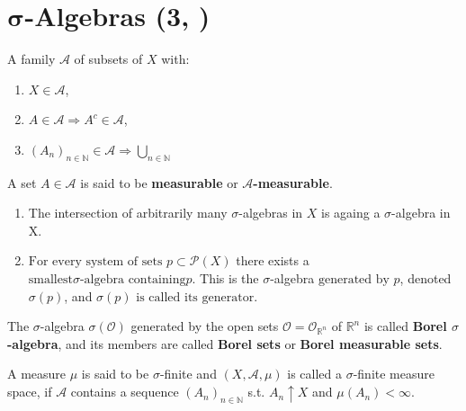 \section{\underline{}\(\boldsymbol{\sigma}\)-Algebras \tiny{(3, \cite{schilling2017measures})}}
\begin{definition}
    A family \(\mathscr{A}\) of subsets of \(X\) with:
    \begin{enumerate}[label=(\roman*)]
        \item \(X\in\mathscr{A}\), \label{ax:sigma1}
        \item \(A\in\mathscr{A} \Rightarrow A^c \in\mathscr{A}\), \label{ax:sigma2}
        \item \(\left( A_n \right)_{n\in\mathbb{N}} \in\mathscr{A} \Rightarrow \bigcup\limits_{n\in\mathbb{N}} \)
    \end{enumerate}
    A set \(A\in\mathscr{A}\) is said to be \textbf{measurable} or \(\boldsymbol{\mathscr{A}}\)\textbf{-measurable}.
\end{definition}
\begin{theorem}
    \quad 

    \begin{enumerate}[label=(\roman*)]
        \item The intersection of arbitrarily many \(\sigma\)-algebras in \(X\) is againg a \(\sigma\)-algebra in X.
        \item \(\text{For every system of sets }p \subset \mathscr{P}(X)\) there exists a 
        \(\text{smallest} \sigma\text{-algebra containing} p. \) This is the \(\sigma\)-algebra
        \(\text{generated by } p\), denoted \(\sigma(p)\), and 
        \(\sigma(p) \text{ is called its generator}\).
    \end{enumerate}
\end{theorem}
\begin{definition}[Borel]
    The \(\sigma\)-algebra \(\sigma(\mathcal{O})\) generated by the open sets \(\mathcal{O} = \mathcal{O}_{\mathbb{R}^n}\) of $\mathbb{R}^n$
    is called \textbf{Borel $\sigma$-algebra}, and its members are called \textbf{Borel sets} or
    \textbf{Borel measurable sets}.
\end{definition}

\begin{definition}
    A measure \(\mu\) is said to be \(\sigma\)-finite and \(\left(X,\mathcal{A},\mu\right)\) is called a \(\sigma\)-finite measure space,
    if \(\mathcal{A}\) contains a sequence \((A_n)_{n\in\mathbb{N}}\) s.t. \(A_n\uparrow X\) and \(\mu(A_n)<\infty\).
\end{definition}
